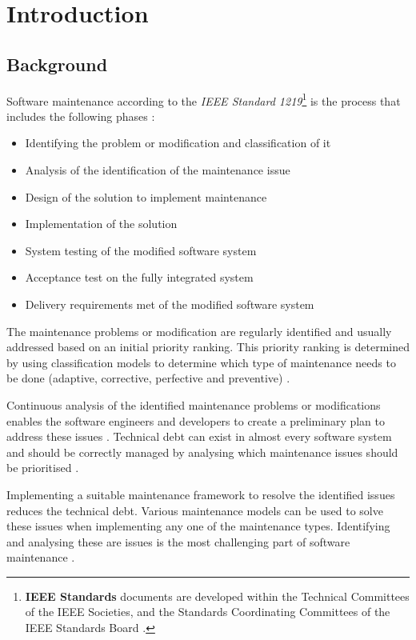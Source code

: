 \chapter{Introduction}
\label{chap:1}

\section{Background}\label{section:background}

Software maintenance according to the \textit{IEEE Standard 1219}\footnote{\textbf{IEEE Standards} documents are developed within the Technical Committees of the IEEE Societies, and the Standards Coordinating Committees of the IEEE Standards Board \cite{Mamone1994}.} is the process that includes the following phases \cite{Mamone1994, Hasan2012}:
\begin{itemize}
	\item Identifying the problem or modification and classification of it
	\item Analysis of the identification of the maintenance issue
	\item Design of the solution to implement maintenance
	\item Implementation of the solution
	\item System testing of the modified software system
	\item Acceptance test on the fully integrated system
	\item Delivery requirements met of the modified software system
\end{itemize}

The maintenance problems or modification are regularly identified and usually addressed based on an initial priority ranking. This priority ranking is determined by using classification models to determine which type of maintenance needs to be done (adaptive, corrective, perfective and preventive) \cite{Tang2010,Mamone1994,Ping2010}.\par Continuous analysis of the identified maintenance problems or modifications enables the software engineers and developers to create a preliminary plan to address these issues \cite{Port2017}. Technical debt can exist in almost every software system and should be correctly managed by analysing which maintenance issues should be prioritised \cite{DeLeon-Sigg2020,Reimanis2016}.\par Implementing a suitable maintenance framework to resolve the identified issues reduces the technical debt. Various maintenance models can be used to solve these issues when implementing any one of the maintenance types. Identifying and analysing these are issues is the most challenging part of software maintenance \cite{DeLeon-Sigg2020}.


